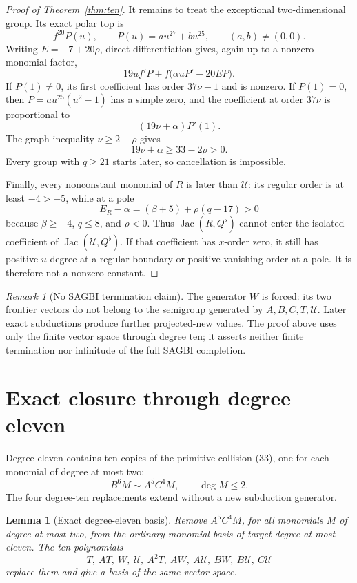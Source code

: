 \documentclass[11pt]{article}
\newtheorem{lemma}[theorem]{Lemma}
\theoremstyle{remark}
\newtheorem{remark}[theorem]{Remark}
\newcommand{\Jac}{\operatorname{Jac}}
\newcommand{\cU}{\mathcal U}
\begin{document}
\begin{proof}[Proof of Theorem~\ref{thm:ten}]
It remains to treat the exceptional two-dimensional group.  Its exact
polar top is
\[
f^{20}P(u),\qquad P(u)=a u^{27}+b u^{25},
\qquad(a,b)\ne(0,0).
\tag{50}
\]
Writing \(E=-7+20\rho\), direct differentiation gives, again up to a
nonzero monomial factor,
\[
19u f'P+f\bigl(\alpha uP'-20EP\bigr).
\tag{51}
\]
If \(P(1)\ne0\), its first coefficient has order \(37\nu-1\) and is
nonzero.  If \(P(1)=0\), then \(P=a u^{25}(u^2-1)\) has a simple zero,
and the coefficient at order \(37\nu\) is proportional to
\[
(19\nu+\alpha)P'(1).
\tag{52}
\]
The graph inequality \(\nu\ge2-\rho\) gives
\[
19\nu+\alpha\ge33-2\rho>0.
\tag{53}
\]
Every group with \(q\ge21\) starts later, so cancellation is impossible.

Finally, every nonconstant monomial of \(R\) is later than \(\cU\):
its regular order is at least \(-4>-5\), while at a pole
\[
E_R-\alpha=(\beta+5)+\rho(q-17)>0
\tag{54}
\]
because \(\beta\ge-4\), \(q\le8\), and \(\rho<0\).  Thus
\(\Jac(R,Q^\flat)\) cannot enter the isolated coefficient of
\(\Jac(\cU,Q^\flat)\).  If that coefficient has \(x\)-order zero, it
still has positive \(u\)-degree at a regular boundary or positive
vanishing order at a pole.  It is therefore not a nonzero constant.
\end{proof}

\begin{remark}[No SAGBI termination claim]
The generator \(W\) is forced: its two frontier vectors do not belong to
the semigroup generated by \(A,B,C,T,\cU\).  Later exact subductions
produce further projected-new values.  The proof above uses only the
finite vector space through degree ten; it asserts neither finite
termination nor infinitude of the full SAGBI completion.
\end{remark}

\section{Exact closure through degree eleven}

Degree eleven contains ten copies of the primitive collision (33), one
for each monomial of degree at most two:
\[
B^6M\sim A^5C^4M,\qquad \deg M\le2.
\tag{55}
\]
The four degree-ten replacements extend without a new subduction
generator.

\begin{lemma}[Exact degree-eleven basis]
\label{lem:basis-eleven}
Remove \(A^5C^4M\), for all monomials \(M\) of degree at most two, from
the ordinary monomial basis of target degree at most eleven.  The ten
polynomials
\[
T,\ AT,\ W,\ \cU,\ A^2T,\ AW,\ A\cU,\ BW,\ B\cU,\ C\cU
\tag{56}
\]
replace them and give a basis of the same vector space.
\end{lemma}
\end{document}
